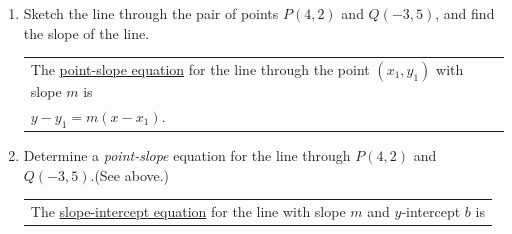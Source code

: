 \documentclass[11pt]{article}
\begin{document}
\begin{enumerate}
\item Sketch the line through the pair of points $P(4,2)$ and $Q(-3,5 )$, and find the slope of the line. \\

\hspace{-.3in} \begin{tabular}{| l |}\hline
 \noindent The \underline{point-slope equation} for the line through the point $(x_1,y_1)$ with slope $m$ is \\

 $y-y_1 = m(x-x_1)$. \\ \hline
\end{tabular} 

\vspace{-.1in}
\item Determine a \emph{point-slope} equation for the line through $P(4,2)$ and $Q(-3,5)$.(See above.)\\[1in]






\hspace{-.3in} \begin{tabular}{| l |}\hline The \underline{slope-intercept equation} for the line with slope $m$ and $y$-intercept $b$ is \\


\end{tabular}
\end{enumerate}
\end{document}
